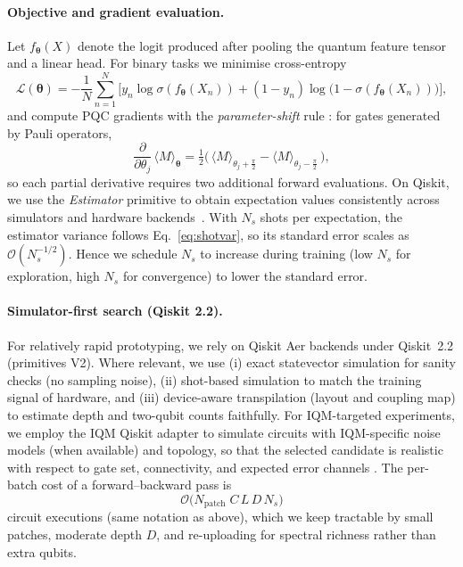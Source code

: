 \paragraph{Objective and gradient evaluation.}
Let $f_{\boldsymbol{\theta}}(X)$ denote the logit produced after pooling the quantum feature tensor and a linear head. For binary tasks we minimise cross-entropy
\begin{equation}
\mathcal{L}(\boldsymbol{\theta})
= -\frac{1}{N}\sum_{n=1}^{N}\!\big[y_n\log \sigma(f_{\boldsymbol{\theta}}(X_n)) + (1-y_n)\log \!\big(1-\sigma(f_{\boldsymbol{\theta}}(X_n))\big)\big],
\end{equation}
and compute PQC gradients with the \emph{parameter-shift} rule \cite{Schuld2019Grad,Mitarai2018}: for gates generated by Pauli operators,
\begin{equation}
\frac{\partial}{\partial \theta_j}\,\langle M\rangle_{\boldsymbol{\theta}}
= \tfrac{1}{2}\Big(\,\langle M\rangle_{\theta_j+\tfrac{\pi}{2}} - \langle M\rangle_{\theta_j-\tfrac{\pi}{2}}\,\Big),
\label{eq:psr-34}
\end{equation}
so each partial derivative requires two additional forward evaluations. On Qiskit, we use the \emph{Estimator} primitive to obtain expectation values consistently across simulators and hardware backends~\cite{QiskitEstimatorDocs,Qiskit2019}. With $N_s$ shots per expectation, the estimator variance follows Eq.~\ref{eq:shotvar}, so its standard error scales as $\mathcal{O}(N_s^{-1/2})$. Hence we schedule $N_s$ to increase during training (low $N_s$ for exploration, high $N_s$ for convergence) to lower the standard error.

\paragraph{Simulator-first search (Qiskit 2.2).}
For relatively rapid prototyping, we rely on Qiskit Aer backends under Qiskit~2.2 (primitives V2). Where relevant, we use (i) exact statevector simulation for sanity checks (no sampling noise), (ii) shot-based simulation to match the training signal of hardware, and (iii) device-aware transpilation (layout and coupling map) to estimate depth and two-qubit counts faithfully. For IQM-targeted experiments, we employ the IQM Qiskit adapter to simulate circuits with IQM-specific noise models (when available) and topology, so that the selected candidate is realistic with respect to gate set, connectivity, and expected error channels \cite{IQMClientDocs2025,QiskitOnIQMGuide}. The per-batch cost of a forward–backward pass is
\begin{equation}
\mathcal{O}\!\big(N_{\text{patch}}\;C\,L\,D\,N_s\big)
\end{equation}
circuit executions (same notation as above), which we keep tractable by small patches, moderate depth $D$, and re-uploading for spectral richness rather than extra qubits.

